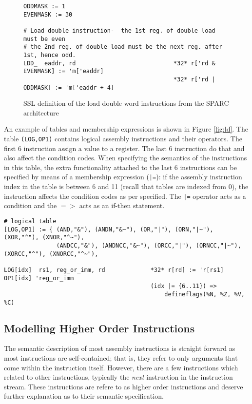 \begin{figure}[h] 
\begin{footnotesize} 
\begin{verbatim}  
ODDMASK := 1 
EVENMASK := 30 
 
# Load double instruction-  the 1st reg. of double load must be even 
# the 2nd reg. of double load must be the next reg. after 1st, hence odd.  
LDD_  eaddr, rd                            *32* r['rd & EVENMASK] := 'm['eaddr] 
                                           *32* r['rd | ODDMASK] := 'm['eaddr + 4] 
\end{verbatim} 
\end{footnotesize} 
\caption{\label{fig-srtl} SSL definition of the load double word instructions from the SPARC architecture}  
\end{figure}  


An example of tables and membership expressions is shown in
Figure \ref{fig:ld}.
The table \texttt{(LOG,OP1)} contains logical assembly instructions
and their operators.  The first 6 instruction assign a value to 
a register.  The last 6 instruction do that and also affect the 
condition codes. 
When specifying the semantics of the instructions in this table,
the extra functionality attached to the last 6 instructions can
be specified by means of a membership expression (\texttt{|=}): if 
the assembly instruction index in the table is between 6 and 11 (recall 
that tables are indexed from 0), the instruction affects the condition 
codes as per specified.
The \texttt{|=} operator acts as a condition and the $=>$ acts as an
if-then statement. 

\centerfigbegin
\begin{footnotesize} 
\begin{verbatim} 
# logical table 
[LOG,OP1] := { (AND,"&"), (ANDN,"&~"), (OR,"|"), (ORN,"|~"), (XOR,"^"), (XNOR,"^~"), 
               (ANDCC,"&"), (ANDNCC,"&~"), (ORCC,"|"), (ORNCC,"|~"), (XORCC,"^"), (XNORCC,"^~"), 
 
LOG[idx]  rs1, reg_or_imm, rd             *32* r[rd] := 'r[rs1] OP1[idx] 'reg_or_imm 
                                          (idx |= {6..11}) => 
                                              defineflags(%N, %Z, %V, %C)
\end{verbatim} 
\end{footnotesize} 


\subsection{Modelling Higher Order Instructions}
\label{sec-hoInsts}
The semantic description of most assembly instructions is straight 
forward as most instructions are self-contained; that is, they
refer to only arguments that come within the instruction itself.
However, there are a few instructions which related to other
instructions, typically the \emph{next} instruction in the
instruction stream.  These instructions are refere to as 
higher order instructions and deserve further explanation as 
to their semantic specification.

